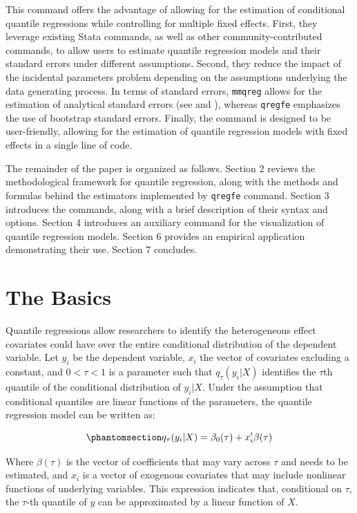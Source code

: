 \documentclass[bib]{statapress}
\begin{document}
This command offers the advantage of allowing for the estimation of
conditional quantile regressions while controlling for multiple fixed
effects. First, they leverage existing Stata commands, as well as other
community-contributed commands, to allow users to estimate quantile
regression models and their standard errors under different assumptions.
Second, they reduce the impact of the incidental parameters problem
depending on the assumptions underlying the data generating process. In
terms of standard errors, \texttt{mmqreg} allows for the estimation of
analytical standard errors (see \citet{mss2019} and
\citet{riosavila2024}), whereas \texttt{qregfe} emphasizes the use of
bootstrap standard errors. Finally, the command is designed to be
user-friendly, allowing for the estimation of quantile regression models
with fixed effects in a single line of code.

The remainder of the paper is organized as follows. Section 2 reviews
the methodological framework for quantile regression, along with the
methods and formulas behind the estimators implemented by
\texttt{qregfe} command. Section 3 introduces the commands, along with a
brief description of their syntax and options. Section 4 introduces an
auxiliary command for the visualization of quantile regression models.
Section 6 provides an empirical application demonstrating their use.
Section 7 concludes.

\section{The Basics}\label{sec-basics}

Quantile regressions allow researchers to identify the heterogeneous
effect covariates could have over the entire conditional distribution of
the dependent variable. Let \(y_i\) be the dependent variable, \(x_i\)
the vector of covariates excluding a constant, and \(0<\tau<1\) is a
parameter such that \(q_\tau(y_i|X)\) identifies the \(\tau\)th quantile
of the conditional distribution of \(y_i|X\). Under the assumption that
conditional quantiles are linear functions of the parameters, the
quantile regression model can be written as:

\begin{equation}\phantomsection\label{eq-qr}{q_\tau(y_i|X)=\beta_0(\tau) + x_i'\beta(\tau)
}\end{equation}

Where \(\beta(\tau)\) is the vector of coefficients that may vary across
\(\tau\) and needs to be estimated, and \(x_i\) is a vector of exogenous
covariates that may include nonlinear functions of underlying variables.
This expression indicates that, conditional on \(\tau\), the \(\tau\)-th
quantile of \(y\) can be approximated by a linear function of \(X\).
\end{document}

